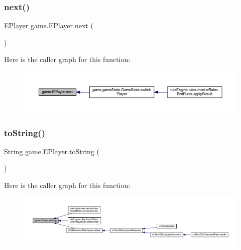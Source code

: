 \mbox{\label{enumgame_1_1_e_player_afdda1f94daa9a373b69033454063a4b3}} 
\subsubsection{\texorpdfstring{next()}{next()}}
{\footnotesize\ttfamily \mbox{\hyperlink{enumgame_1_1_e_player}{E\+Player}} game.\+E\+Player.\+next (\begin{DoxyParamCaption}{ }\end{DoxyParamCaption})\hspace{0.3cm}{\ttfamily [inline]}}

Here is the caller graph for this function\+:
\nopagebreak
\begin{figure}[H]
\begin{center}
\leavevmode
\includegraphics[width=350pt]{enumgame_1_1_e_player_afdda1f94daa9a373b69033454063a4b3_icgraph}
\end{center}
\end{figure}
\mbox{\label{enumgame_1_1_e_player_a74855692721e2ddd60963b62571d7e3e}} 
\subsubsection{\texorpdfstring{to\+String()}{toString()}}
{\footnotesize\ttfamily String game.\+E\+Player.\+to\+String (\begin{DoxyParamCaption}{ }\end{DoxyParamCaption})\hspace{0.3cm}{\ttfamily [inline]}}

Here is the caller graph for this function\+:
\nopagebreak
\begin{figure}[H]
\begin{center}
\leavevmode
\includegraphics[width=350pt]{enumgame_1_1_e_player_a74855692721e2ddd60963b62571d7e3e_icgraph}
\end{center}
\end{figure}


